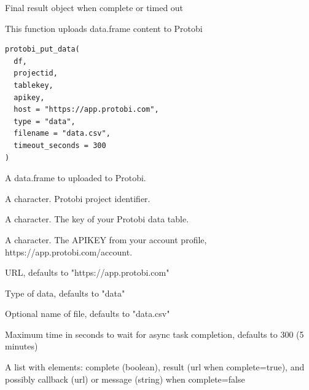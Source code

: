 \documentclass[a4paper]{book}
\begin{document}
%
\begin{Value}
Final result object when complete or timed out
\end{Value}
%
\begin{Description}\relax
This function uploads data.frame content to Protobi
\end{Description}
%
\begin{Usage}
\begin{verbatim}
protobi_put_data(
  df,
  projectid,
  tablekey,
  apikey,
  host = "https://app.protobi.com",
  type = "data",
  filename = "data.csv",
  timeout_seconds = 300
)
\end{verbatim}
\end{Usage}
%
\begin{Arguments}
\begin{ldescription}
\item[\code{df}] A data.frame to uploaded to Protobi.

\item[\code{projectid}] A character. Protobi project identifier.

\item[\code{tablekey}] A character. The key of your Protobi data table.

\item[\code{apikey}] A character. The APIKEY from your account profile, https://app.protobi.com/account.

\item[\code{host}] URL, defaults to "https://app.protobi.com"

\item[\code{type}] Type of data, defaults to "data"

\item[\code{filename}] Optional name of file, defaults to "data.csv"

\item[\code{timeout\_seconds}] Maximum time in seconds to wait for async task completion, defaults to 300 (5 minutes)
\end{ldescription}
\end{Arguments}
%
\begin{Value}
A list with elements: complete (boolean), result (url when complete=true), and possibly callback (url) or message (string) when complete=false
\end{Value}
\end{document}

